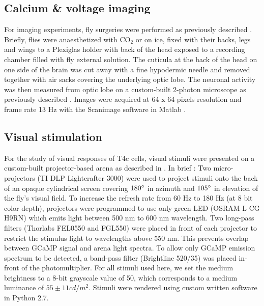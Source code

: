 \documentclass[9pt,lineno]{elife}
\begin{document}
\subsection{Calcium \& voltage imaging}
For imaging experiments, fly surgeries were performed as previously described \parencite{Maisak2013}. Briefly, flies were anaesthetized with CO$_2$ or on ice, fixed with their backs, legs and wings to a Plexiglas holder with back of the head exposed to a recording chamber filled with fly external solution. The cuticula at the back of the head on one side of the brain was cut away with a fine hypodermic needle and removed together with air sacks covering the underlying optic lobe. The neuronal activity was then measured from optic lobe on a custom-built 2-photon microscope as previously described \parencite{Maisak2013}. Images were acquired at 64 x 64 pixels resolution and frame rate 13 Hz with the Scanimage software in Matlab  \parencite{Pologruto2003}.

\subsection{Visual stimulation}
For the study of visual responses of T4c cells, visual stimuli were presented on a custom-built projector-based arena as described in \parencite{Arenz2017}. In brief : Two micro-projectors (TI DLP Lightcrafter 3000) were used to project stimuli onto the back of an opaque cylindrical screen covering $180\degree$ in azimuth and $105\degree$ in elevation of the fly's visual field. To increase the refresh rate from 60 Hz to 180 Hz (at 8 bit color depth), projectors were programmed to use only green LED (OSRAM L CG H9RN) which emits light between 500 nm to 600 nm wavelength. Two long-pass filters (Thorlabs FEL0550 and FGL550) were placed in front of each projector to restrict the stimulus light to wavelengths above 550 nm. This prevents overlap between GCaMP signal and arena light spectra. To allow only GCaMP emission spectrum to be detected, a band-pass filter (Brightline 520/35) was placed in-front of the photomultiplier. For all stimuli used here, we set the medium brightness to a 8-bit grayscale value of 50, which corresponds to a medium luminance of $55 \pm 11 cd/m^2$. Stimuli were rendered using custom written software in Python 2.7. 
\end{document}
